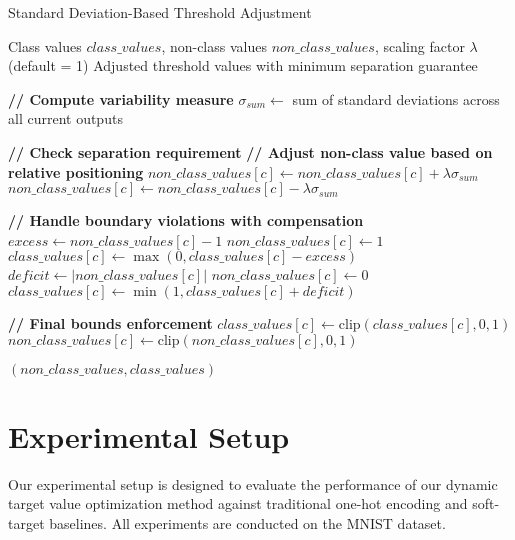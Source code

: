 \documentclass[12pt,fleqn,a4paper]{article}
\begin{document}
\begin{algorithm}[H]
\caption{Standard Deviation-Based Threshold Adjustment}
\label{alg:sigma_spacing}
\begin{algorithmic}[1]
\REQUIRE Class values $class\_values$, non-class values $non\_class\_values$, scaling factor $\lambda$ (default = 1)
\ENSURE Adjusted threshold values with minimum separation guarantee

\STATE \textbf{// Compute variability measure}
\STATE $\sigma_{sum} \leftarrow$ sum of standard deviations across all current outputs

    \STATE \textbf{// Check separation requirement}
        \STATE \textbf{// Adjust non-class value based on relative positioning}
            \STATE $non\_class\_values[c] \leftarrow non\_class\_values[c] + \lambda \sigma_{sum}$
        \ELSE
            \STATE $non\_class\_values[c] \leftarrow non\_class\_values[c] - \lambda \sigma_{sum}$
        \ENDIF
        
        \STATE \textbf{// Handle boundary violations with compensation}
            \STATE $excess \leftarrow non\_class\_values[c] - 1$
            \STATE $non\_class\_values[c] \leftarrow 1$
            \STATE $class\_values[c] \leftarrow \max(0, class\_values[c] - excess)$
            \STATE $deficit \leftarrow |non\_class\_values[c]|$
            \STATE $non\_class\_values[c] \leftarrow 0$
            \STATE $class\_values[c] \leftarrow \min(1, class\_values[c] + deficit)$
        \ENDIF
    \ENDIF
    
    \STATE \textbf{// Final bounds enforcement}
    \STATE $class\_values[c] \leftarrow \text{clip}(class\_values[c], 0, 1)$
    \STATE $non\_class\_values[c] \leftarrow \text{clip}(non\_class\_values[c], 0, 1)$
\ENDFOR

\RETURN $(non\_class\_values, class\_values)$
\end{algorithmic}
\end{algorithm}





\section{Experimental Setup}
 Our experimental setup is designed to evaluate the performance of our dynamic target value optimization method against traditional one-hot encoding and soft-target baselines. All experiments are conducted on the MNIST dataset.
\end{document}
